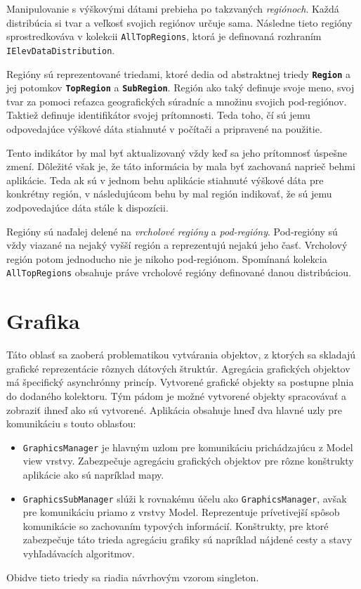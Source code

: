 Manipulovanie s výškovými dátami prebieha po takzvaných \textit{regiónoch}. Každá distribúcia si tvar a veľkosť svojich regiónov určuje sama. Následne tieto regióny sprostredkováva v kolekcii \texttt{AllTopRegions}, ktorá je definovaná rozhraním \texttt{IElevDataDistribution}.

Regióny sú reprezentované triedami, ktoré dedia od abstraktnej triedy \textbf{\texttt{Region}} a jej potomkov \textbf{\texttt{TopRegion}} a \textbf{\texttt{SubRegion}}. Región ako taký definuje svoje meno, svoj tvar za pomoci reťazca geografických súradníc a množinu svojich pod-regiónov. Taktiež definuje identifikátor svojej prítomnosti. Teda toho, čí sú jemu odpovedajúce výškové dáta stiahnuté v počítači a pripravené na použitie.

Tento indikátor by mal byť aktualizovaný vždy keď sa jeho prítomnosť úspešne zmení. Dôležité však je, že táto informácia by mala byť zachovaná naprieč behmi aplikácie. Teda ak sú v jednom behu aplikácie stiahnuté výškové dáta pre konkrétny región, v následujúcom behu by mal región indikovať, že sú jemu zodpovedajúce dáta stále k dispozícii.

Regióny sú naďalej delené na \textit{vrcholové regióny} a \textit{pod-regióny}. Pod-regióny sú vždy viazané na nejaký vyšší región a reprezentujú nejakú jeho časť. Vrcholový región potom jednoducho nie je nikoho pod-regiónom. Spomínaná kolekcia \texttt{AllTopRegions} obsahuje práve vrcholové regióny definované danou distribúciou.    

\section{Grafika}

Táto oblasť sa zaoberá problematikou vytvárania objektov, z ktorých sa skladajú grafické reprezentácie rôznych dátových štruktúr. Agregácia grafických objektov má špecifický asynchrónny princíp. Vytvorené grafické objekty sa postupne plnia do dodaného kolektoru. Tým pádom je možné vytvorené objekty spracovávať a zobraziť ihneď ako sú vytvorené. Aplikácia obsahuje hneď dva hlavné uzly pre komunikáciu s touto oblasťou:
\begin{itemize}
    \item \texttt{GraphicsManager} je hlavným uzlom pre komunikáciu prichádzajúcu z Model view vrstvy. Zabezpečuje agregáciu grafických objektov pre rôzne konštrukty aplikácie ako sú napríklad mapy.
    \item \texttt{GraphicsSubManager} slúži k rovnakému účelu ako \texttt{GraphicsManager}, avšak pre komunikáciu priamo z vrstvy Model. Reprezentuje prívetivejší spôsob komunikácie so zachovaním typových informácií. Konštrukty, pre ktoré zabezpečuje táto trieda agregáciu grafiky sú napríklad nájdené cesty a stavy vyhľadávacích algoritmov. 
\end{itemize}
Obidve tieto triedy sa riadia návrhovým vzorom singleton.

